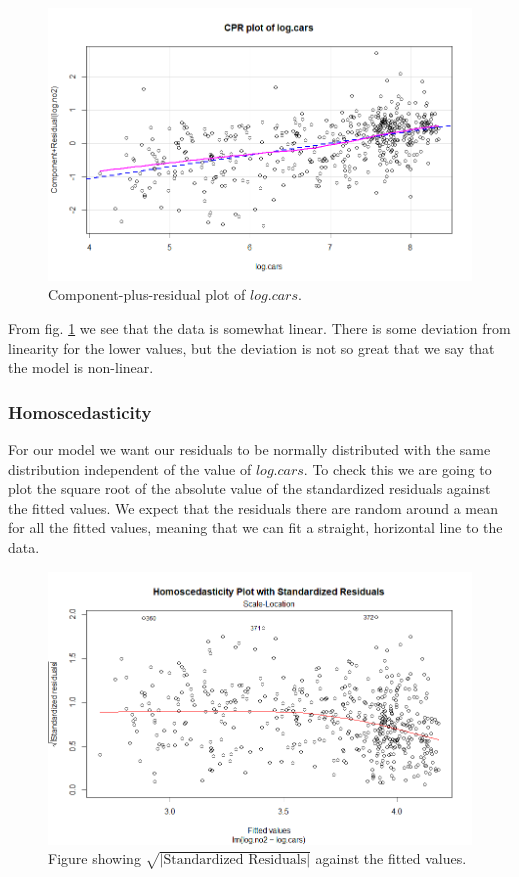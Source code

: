 \documentclass[a4paper,norsk, 10pt]{article}
\begin{document}
\begin{figure}[!htbp]
\centering
\includegraphics[scale=0.5]{cpr_cars.png}
\caption{Component-plus-residual plot of $log.cars$.}\label{fig:cpr}
\end{figure}

From fig. \ref{fig:cpr} we see that the data is somewhat linear. There is some deviation from linearity for the lower values, but  the deviation is not so great that we say that the model is non-linear.


\subsubsection*{Homoscedasticity}
For our model we want our residuals to be normally distributed with the same distribution independent of the value of $log.cars$. To check this we are going to plot the square root of the absolute value of the standardized residuals against the fitted values. We expect that the residuals there are random around a mean for all the fitted values, meaning that we can fit a straight, horizontal line  to the data. 
	
\begin{figure}[!htbp]
\centering
\includegraphics[scale=0.5]{stand_res.png}
\caption{Figure showing $\sqrt{|\text{Standardized Residuals}|}$ against the fitted values.}\label{fig:stand_res}
\end{figure}
\end{document}
